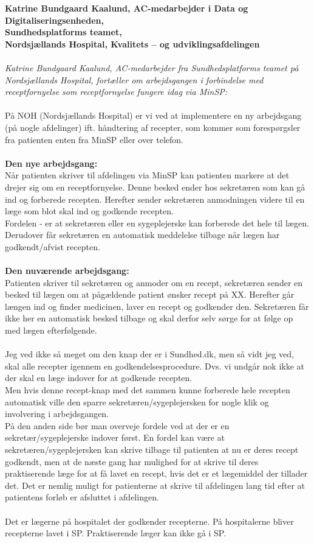 \textbf{Katrine Bundgaard Kaalund, AC-medarbejder i Data og Digitaliseringsenheden,\\
	Sundhedsplatforms teamet,  \\
	Nordsjællands Hospital, Kvalitets – og udviklingsafdelingen}\\\\
\textit{Katrine Bundgaard Kaalund, AC-medarbejder fra Sundhedsplatforms teamet på Nordsjællands Hospital, fortæller om arbejdsgangen i forbindelse med receptfornyelse som receptfornyelse fungere idag via MinSP:}\\\\
På NOH (Nordsjællands Hospital) er vi ved at implementere en ny arbejdsgang (på nogle afdelinger) ift. håndtering af recepter, som kommer som forespørgsler fra patienten enten fra MinSP eller over telefon.\\\\
\textbf{Den nye arbejdsgang:} \\
Når patienten skriver til afdelingen via MinSP kan patienten markere at det drejer sig om en receptfornyelse. Denne besked ender hos sekretæren som kan gå ind og forberede recepten. Herefter sender sekretæren anmodningen videre til en læge som blot skal ind og godkende recepten. \\
Fordelen - er at sekretæren eller en sygeplejerske kan forberede det hele til lægen. Derudover får sekretæren en automatisk meddelelse tilbage når lægen har godkendt/afvist recepten.\\\\
\textbf{Den nuværende arbejdsgang:}\\
Patienten skriver til sekretæren og anmoder om en recept, sekretæren sender en besked til lægen om at pågældende patient ønsker recept på XX. Herefter går længen ind og finder medicinen, laver en recept og godkender den. Sekretæren får ikke her en automatisk besked tilbage og skal derfor selv sørge for at følge op med lægen efterfølgende.\\\\
Jeg ved ikke så meget om den knap der er i Sundhed.dk, men så vidt jeg ved, skal alle recepter igennem en godkendelsesprocedure. Dvs. vi undgår nok ikke at der skal en læge indover for at godkende recepten. \\
Men hvis denne recept-knap med det sammen kunne forberede hele recepten automatisk ville den sparre sekretæren/sygeplejersken for nogle klik og involvering i arbejdsgangen. \\
På den anden side bør man overveje fordele ved at der er en sekretær/sygeplejerske indover først. En fordel kan være at sekretæren/sygeplejersken kan skrive tilbage til patienten at nu er deres recept godkendt, men at de næste gang har mulighed for at skrive til deres praktiserende læge for at få lavet en recept, hvis det er et lægemiddel der tillader det. Det er nemlig muligt for patienterne at skrive til afdelingen lang tid efter at patientens forløb er afsluttet i afdelingen.
\\\\
Det er lægerne på hospitalet der godkender recepterne. På hospitalerne bliver recepterne lavet i SP. Praktiserende læger kan ikke gå i SP.

